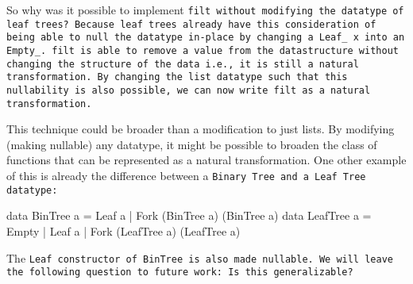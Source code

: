 So why was it possible to implement \tt{filt} without modifying the datatype of leaf trees?
Because leaf trees already have this consideration of being able to null the datatype in-place by changing a \tt{Leaf\_ x} into an \tt{Empty\_}.
\tt{filt} is able to remove a value from the datastructure without changing the structure of the data i.e., it is still a natural transformation.
By changing the list datatype such that this nullability is also possible, we can now write \tt{filt} as a natural transformation.

This technique could be broader than a modification to just lists.
By modifying (making nullable) any datatype, it might be possible to broaden the class of functions that can be represented as a natural transformation.
One other example of this is already the difference between a \tt{Binary Tree} and a \tt{Leaf Tree} datatype:
\begin{spec}
data BinTree a = Leaf a | Fork (BinTree a) (BinTree a)
data LeafTree a = Empty | Leaf a | Fork (LeafTree a) (LeafTree a)
\end{spec}
The \tt{Leaf} constructor of \tt{BinTree} is also made nullable.
We will leave the following question to future work: Is this generalizable?






